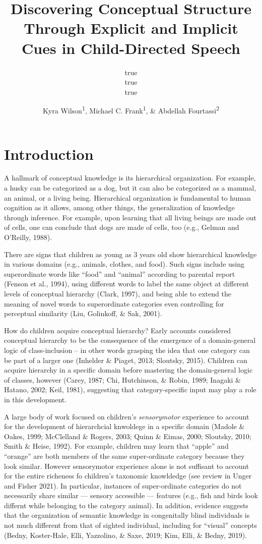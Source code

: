 \documentclass[english,,man,floatsintext]{apa6}
\title{Discovering Conceptual Structure Through Explicit and Implicit Cues in Child-Directed Speech}
\author{true \\ true \\ true}
\date{}
\author{Kyra Wilson\textsuperscript{1}, Michael C. Frank\textsuperscript{1}, \& Abdellah Fourtassi\textsuperscript{2}}
\affiliation{
\vspace{0.5cm}
\textsuperscript{1} Department of Psychology, Stanford University\\\textsuperscript{2} Department of Computer Science, Aix-Marseille University}
\begin{document}
\maketitle

\hypertarget{introduction}{%
\section{Introduction}\label{introduction}}

A hallmark of conceptual knowledge is its hierarchical organization. For example, a husky can be categorized as a dog, but it can also be categorized as a mammal, an animal, or a living being. Hierarchical organization is fundamental to human cognition as it allows, among other things, the generalization of knowledge through inference. For example, upon learning that all living beings are made out of cells, one can conclude that dogs are made of cells, too (e.g., Gelman and O'Reilly, 1988).

There are signs that children as young as 3 years old show hierarchical knowledge in various domains (e.g., animals, clothes, and food). Such
signs include using superordinate words like \enquote{food} and \enquote{animal} according to parental report (Fenson et al., 1994), using different words to label the same object at different levels of conceptual hierarchy (Clark, 1997), and being able to extend the meaning of novel words to superordinate categories even controlling for perceptual similarity (Liu, Golinkoff, \& Sak, 2001).

How do children acquire conceptual hierarchy? Early accounts considered
conceptual hierarchy to be the consequence of the emergence of a
domain-general logic of class-inclusion -- in other words grasping the idea that one category can be part of a larger one
(Inhelder \& Piaget, 2013; Sloutsky, 2015). Children can acquire hierarchy in a specific domain before mastering the domain-general logic of classes, however (Carey, 1987; Chi, Hutchinson, \& Robin, 1989; Inagaki \& Hatano, 2002; Keil, 1981), suggesting that category-specific input may play a role in this development.

A large body of work focused on children's \emph{sensorymotor} experience to account for the development of hierarchcial knwoldege in a specific domain (Madole \& Oakes, 1999; McClelland \& Rogers, 2003; Quinn \& Eimas, 2000; Sloutsky, 2010; Smith \& Heise, 1992). For example, children may learn that \enquote{apple} and \enquote{orange} are both members of the same super-ordinate category because they look similar. However sensorymotor experience alone is not suffisant to account for the entire richeness fo children's taxonomic knowldedge (see review in Unger and Fisher 2021). In particular, instances of super-ordinate categories do not necessarily share similar --- sensory accessible --- features (e.g., fish and birds look differnt while belonging to the category animal). In addition, evidence suggests that the organization of semantic knowledge in congenitally blind individuals is not much different from that of sighted individual, including for ``visual'' concepts (Bedny, Koster-Hale, Elli, Yazzolino, \& Saxe, 2019; Kim, Elli, \& Bedny, 2019).
\end{document}
